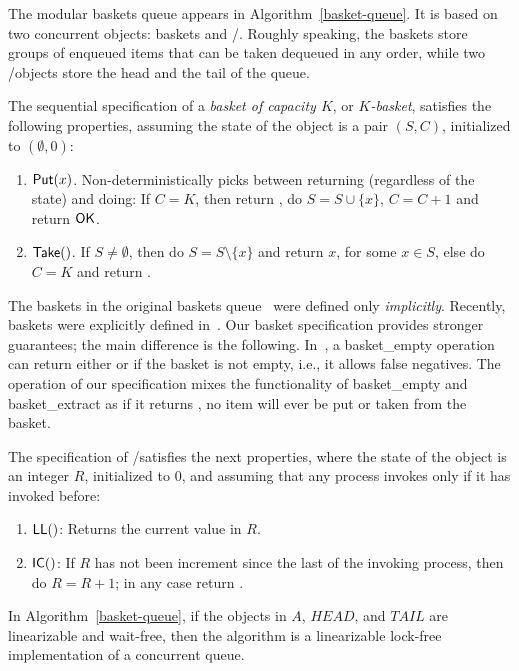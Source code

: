 The modular baskets queue appears in Algorithm~\ref{basket-queue}.  It is based on two concurrent objects: baskets and \LL/\IC.  Roughly speaking, the baskets store groups of enqueued items that can be taken dequeued in any order, while two \LL/\IC objects store the head and the tail of the queue.

The sequential specification of a \emph{basket of capacity $K$}, or \emph{$K$-basket}, satisfies the following properties, assuming the state of the object is a pair $(S, C)$, initialized to $(\emptyset, 0)$:

\begin{enumerate}
    \item ${\sf \small Put}(x)$. Non-deterministically picks between returning \full (regardless of the state) and doing: If $C = K$, then return \full, do $S = S \cup \{x\}$, $C = C +1$ and return ${\sf \small OK}$.
    \item ${\sf \small Take}()$. If $S \neq \emptyset$, then do $S = S \setminus \{x\}$ and return $x$, for some $x \in S$, else do $C = K$ and return \closed.
\end{enumerate}

The baskets in the original baskets queue~\cite{basketqueue2007} were defined only \emph{implicitly}. Recently, baskets were explicitly defined in~\cite{scalingconcurrent2020}.  Our basket specification provides stronger guarantees; the main difference is the following.  In~\cite{scalingconcurrent2020}, a {\sf basket\_empty} operation can return either \true or \false if the basket is not empty, i.e., it allows false negatives.  The \Take operation of our specification mixes the functionality of {\sf basket\_empty} and {\sf basket\_extract} as if it returns \closed, no item will ever be put or taken from the basket.

The specification of \LL/\IC satisfies the next properties, where the state of the object is an integer $R$, initialized to 0, and assuming that any process invokes \IC only if it has invoked \LL before:

\begin{enumerate}
\item ${\sf \small LL}()$: Returns the current value in $R$.
\item ${\sf \small IC}()$: If $R$ has not been increment since the last \LL of the invoking process,
then do $R = R + 1$; in any case return \ok.
\end{enumerate}


\begin{theorem}
  In Algorithm~\ref{basket-queue}, if the objects in $A$, $HEAD$, and $TAIL$ are linearizable and wait-free, then the algorithm is a linearizable lock-free implementation of a concurrent queue.
\end{theorem}

